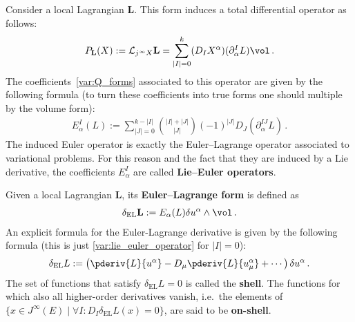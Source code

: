     \begin{example}
        Consider a local Lagrangian $\mathbf{L}$. This form induces a total differential operator as follows:
        \begin{gather}
            P_{\mathbf{L}}(X) := \mathcal{L}_{j^\infty X}\mathbf{L} = \sum_{|I|=0}^k(D_IX^\alpha)(\partial^I_\alpha L)\vol\,.
        \end{gather}
        The coefficients~\eqref{var:Q_forms} associated to this operator are given by the following formula (to turn these coefficients into true forms one should multiple by the volume form):
        \begin{gather}
            \label{var:lie_euler_operator}
            E^I_\alpha(L) := \sum_{|J|=0}^{k-|I|}\binom{|I|+|J|}{|J|}(-1)^{|J|}D_J\left(\partial^{IJ}_\alpha L\right)\,.
        \end{gather}
        The induced Euler operator is exactly the Euler--Lagrange operator associated to variational problems. For this reason and the fact that they are induced by a Lie derivative, the coefficients $E^I_\alpha$ are called \textbf{Lie--Euler operators}.

        Given a local Lagrangian $\mathbf{L}$, its \textbf{Euler--Lagrange form} is defined as
        \begin{gather}
            \delta_{\text{EL}}\mathbf{L} := E_\alpha(L)\delta u^\alpha\wedge\vol\,.
        \end{gather}
        An explicit formula for the Euler-Lagrange derivative is given by the following formula (this is just \cref{var:lie_euler_operator} for $|I|=0$):
        \begin{gather}
            \label{var:euler_lagrange_derivative}
            \delta_{\text{EL}}L := \left(\pderiv{L}{u^\alpha} - D_\mu\pderiv{L}{u^\alpha_\mu} + \cdots\right)\delta u^\alpha\,.
        \end{gather}
        The set of functions that satisfy $\delta_{\text{EL}}L=0$ is called the \textbf{shell}. The functions for which also all higher-order derivatives vanish, i.e.~the elements of $\{x\in J^\infty(E)\mid\forall I:D_I\delta_{\text{EL}}L(x) = 0\}$, are said to be \textbf{on-shell}.
    \end{example}

